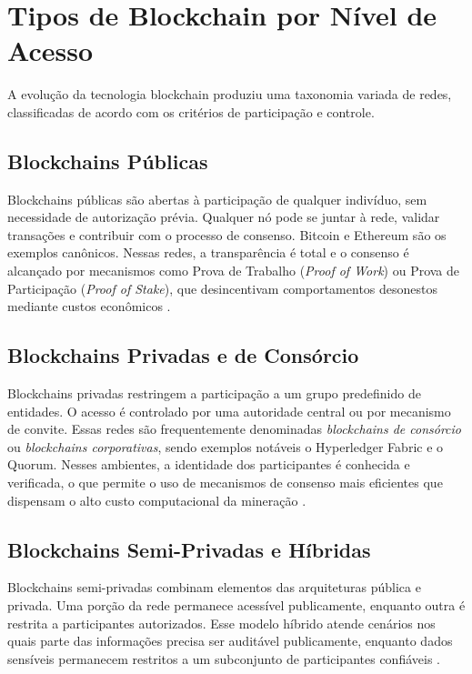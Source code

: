 \documentclass[12pt,a4paper]{report}
\begin{document}
\section[Tipos de Blockchain por Acesso]{Tipos de Blockchain por Nível de Acesso}

A evolução da tecnologia blockchain produziu uma taxonomia variada de redes, classificadas de acordo com os critérios de participação e controle.

\subsection{Blockchains Públicas}

Blockchains públicas são abertas à participação de qualquer indivíduo, sem necessidade de autorização prévia. Qualquer nó pode se juntar à rede, validar transações e contribuir com o processo de consenso. Bitcoin e Ethereum são os exemplos canônicos. Nessas redes, a transparência é total e o consenso é alcançado por mecanismos como Prova de Trabalho (\textit{Proof of Work}) ou Prova de Participação (\textit{Proof of Stake}), que desincentivam comportamentos desonestos mediante custos econômicos \cite{Bashir2023}.

\subsection{Blockchains Privadas e de Consórcio}

Blockchains privadas restringem a participação a um grupo predefinido de entidades. O acesso é controlado por uma autoridade central ou por mecanismo de convite. Essas redes são frequentemente denominadas \textit{blockchains de consórcio} ou \textit{blockchains corporativas}, sendo exemplos notáveis o Hyperledger Fabric e o Quorum. Nesses ambientes, a identidade dos participantes é conhecida e verificada, o que permite o uso de mecanismos de consenso mais eficientes que dispensam o alto custo computacional da mineração \cite{Bashir2023}.

\subsection{Blockchains Semi-Privadas e Híbridas}

Blockchains semi-privadas combinam elementos das arquiteturas pública e privada. Uma porção da rede permanece acessível publicamente, enquanto outra é restrita a participantes autorizados. Esse modelo híbrido atende cenários nos quais parte das informações precisa ser auditável publicamente, enquanto dados sensíveis permanecem restritos a um subconjunto de participantes confiáveis \cite{Bashir2023}.
\end{document}
